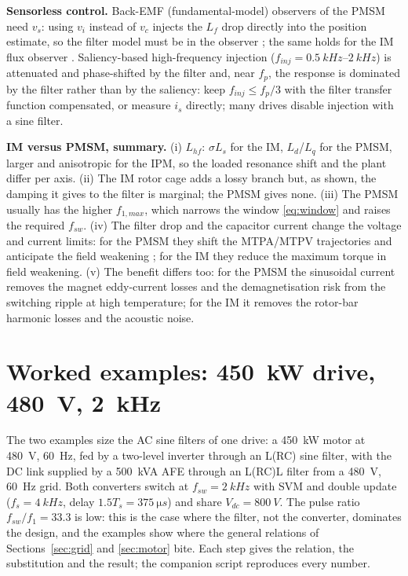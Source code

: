 \documentclass[10pt,a4paper]{scrartcl}
\newcommand{\Vdc}{V_{dc}}
\newcommand{\fsw}{f_{sw}}
\newcommand{\Lhf}{L_{hf}}
\newcommand{\Lf}{L_{f}}
\begin{document}
\begin{onehalfspace}
\textbf{Sensorless control.} Back-EMF (fundamental-model) observers of the PMSM need $v_s$: using $v_i$ instead of $v_c$ injects the $\Lf$ drop directly into the position estimate, so the filter model must be in the observer \cite{salomaki2006b}; the same holds for the IM flux observer \cite{salomaki2006}. Saliency-based high-frequency injection ($f_{inj} = \SIrange{0.5}{2}{kHz}$) is attenuated and phase-shifted by the filter and, near $f_p$, the response is dominated by the filter rather than by the saliency: keep $f_{inj} \le f_p/3$ with the filter transfer function compensated, or measure $i_s$ directly; many drives disable injection with a sine filter.

\textbf{IM versus PMSM, summary.} (i) $\Lhf$: $\sigma L_s$ for the IM, $L_d$/$L_q$ for the PMSM, larger and anisotropic for the IPM, so the loaded resonance shift and the plant differ per axis. (ii) The IM rotor cage adds a lossy branch but, as shown, the damping it gives to the filter is marginal; the PMSM gives none. (iii) The PMSM usually has the higher $f_{1,max}$, which narrows the window \eqref{eq:window} and raises the required $\fsw$. (iv) The filter drop and the capacitor current change the voltage and current limits: for the PMSM they shift the MTPA/MTPV trajectories and anticipate the field weakening \cite{salomaki2008}; for the IM they reduce the maximum torque in field weakening. (v) The benefit differs too: for the PMSM the sinusoidal current removes the magnet eddy-current losses and the demagnetisation risk from the switching ripple at high temperature; for the IM it removes the rotor-bar harmonic losses and the acoustic noise.

\section{Worked examples: \SI{450}{kW} drive, \SI{480}{V}, \SI{2}{kHz}}
\label{sec:examples}
The two examples size the AC sine filters of one drive: a \SI{450}{kW} motor at \SI{480}{V}, \SI{60}{Hz}, fed by a two-level inverter through an L(RC) sine filter, with the DC link supplied by a \SI{500}{kVA} AFE through an L(RC)L filter from a \SI{480}{V}, \SI{60}{Hz} grid. Both converters switch at $\fsw = \SI{2}{kHz}$ with SVM and double update ($f_s = \SI{4}{kHz}$, delay $1.5T_s = \SI{375}{\micro s}$) and share $\Vdc = \SI{800}{V}$. The pulse ratio $\fsw/f_1 = 33.3$ is low: this is the case where the filter, not the converter, dominates the design, and the examples show where the general relations of Sections~\ref{sec:grid} and \ref{sec:motor} bite. Each step gives the relation, the substitution and the result; the companion script reproduces every number.


\end{onehalfspace}
\end{document}
